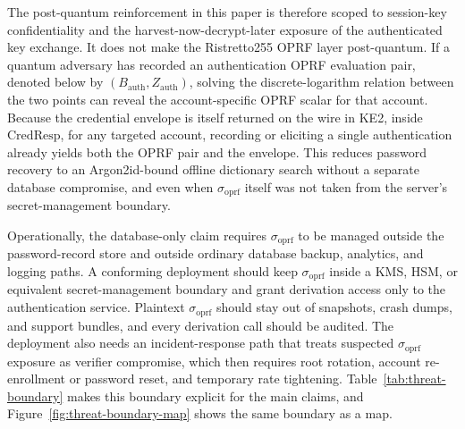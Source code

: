 \documentclass[preprint,12pt]{elsarticle}
\newcommand{\sigoprf}{\sigma_{\mathrm{oprf}}}
\theoremstyle{remark}
\begin{document}
The post-quantum reinforcement in this paper is therefore scoped to
session-key confidentiality and the harvest-now-decrypt-later exposure of
the authenticated key exchange. It does not make the Ristretto255 OPRF
layer post-quantum. If a quantum adversary has recorded an authentication
OPRF evaluation pair, denoted below by
$(B_{\mathrm{auth}}, Z_{\mathrm{auth}})$, solving the discrete-logarithm
relation between the two points can reveal the account-specific OPRF scalar
for that account. Because the credential envelope is itself returned on the
wire in KE2, inside $\mathrm{CredResp}$, for any targeted account, recording or
eliciting a single authentication already yields both the OPRF pair and the
envelope. This reduces password recovery to an Argon2id-bound offline dictionary
search without a separate database compromise, and even when $\sigoprf$ itself
was not taken from the server's secret-management boundary.

Operationally, the database-only claim requires $\sigoprf$ to be managed
outside the password-record store and outside ordinary database backup,
analytics, and logging paths. A conforming deployment should keep
$\sigoprf$ inside a KMS, HSM, or equivalent secret-management boundary
and grant derivation access only to the authentication service. Plaintext
$\sigoprf$ should stay out of snapshots, crash dumps, and support bundles,
and every derivation call should be audited. The deployment also needs an
incident-response path that treats suspected $\sigoprf$ exposure as
verifier compromise, which then requires root rotation, account
re-enrollment or password reset, and temporary rate tightening.
Table~\ref{tab:threat-boundary} makes this boundary explicit for the
main claims, and Figure~\ref{fig:threat-boundary-map} shows the same
boundary as a map.
\end{document}
